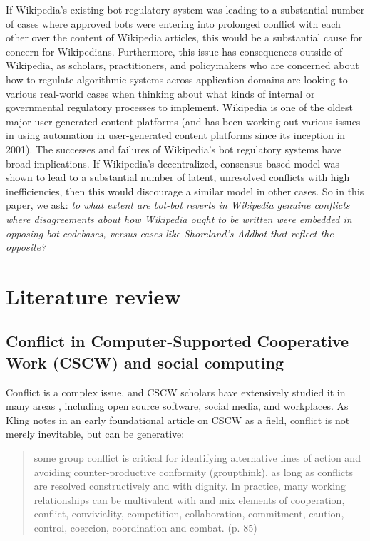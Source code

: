 \documentclass[format=acmsmall, review=false, screen=true]{acmart}%
\begin{document}
If Wikipedia's existing bot regulatory system was leading to a substantial number of cases where approved bots were entering into prolonged conflict with each other over the content of Wikipedia articles, this would be a substantial cause for concern for Wikipedians. Furthermore, this issue has consequences outside of Wikipedia, as scholars, practitioners, and policymakers who are concerned about how to regulate algorithmic systems across application domains are looking to various real-world cases when thinking about what kinds of internal or governmental regulatory processes to implement. \cite{Barocas2013} Wikipedia is one of the oldest major user-generated content platforms (and has been working out various issues in using automation in user-generated content platforms since its inception in 2001). The successes and failures of Wikipedia's bot regulatory systems have broad implications. If Wikipedia's decentralized, consensus-based model was shown to lead to a substantial number of latent, unresolved conflicts with high inefficiencies, then this would discourage a similar model in other cases. So in this paper, we ask: \textit{to what extent are bot-bot reverts in Wikipedia genuine conflicts where disagreements about how Wikipedia ought to be written were embedded in opposing bot codebases, versus cases like Shoreland's Addbot that reflect the opposite?}

\section{Literature review} \label{s:lit}
\subsection{Conflict in Computer-Supported Cooperative Work (CSCW) and social computing}  \label{s:lit:conflictcscw}
Conflict is a complex issue, and CSCW scholars have extensively studied it in many areas \cite{Easterbrook1993, Malone1994}, including open source software, social media, and workplaces. As Kling \cite{Kling1991} notes in an early foundational article on CSCW as a field, conflict is not merely inevitable, but can be generative:  

\begin{quote}
some group conflict is critical for identifying alternative lines of action and avoiding counter-productive conformity (groupthink), as long as conflicts are resolved constructively and with dignity. In practice, many working relationships can be multivalent with and mix elements of cooperation, conflict, conviviality, competition, collaboration, commitment, caution, control, coercion, coordination and combat. (p. 85) \end{quote}
\end{document}
